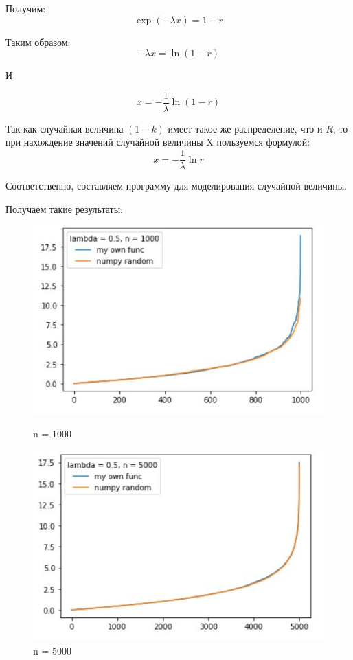 \documentclass[a4paper,12pt, oneside]{book}
\begin{document}
{{Получим:
$$
\exp(- \lambda x) = 1 - r
$$

Таким образом:
$$
- \lambda x = \ln(1 - r)
$$

И

$$
x = -\frac{1}{\lambda} \ln(1 - r)
$$

Так как случайная величина $(1 - k)$ имеет такое же распределение, что и $R$, то при нахождение значений случайной величины X пользуемся формулой:
$$
x = - \frac{1}{\lambda} \ln r
$$

Соответственно, составляем программу для моделирования случайной величины.

Получаем такие результаты:

\begin{figure}[h]
	\begin{center}
		\begin{minipage}[h]{0.4\linewidth}
			\includegraphics[width=1\linewidth]{ex_1_1000.jpg}
			\caption{n = 1000} %
			\label{ris:experimoriginal} %
		\end{minipage}
		\hfill
		\begin{minipage}[h]{0.4\linewidth}
			\includegraphics[width=1\linewidth]{ex_1_5000.jpg}
			\caption{n = 5000}
			\label{ris:experimcoded}
		\end{minipage}
	\end{center}
\end{figure} 

}}
\end{document}
